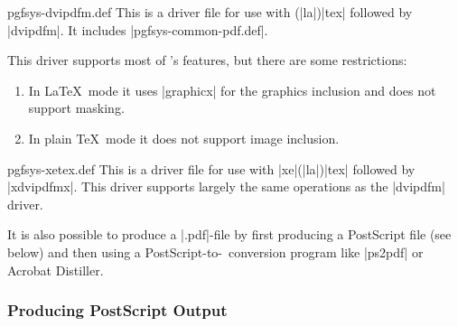 \begin{filedescription}{pgfsys-dvipdfm.def}
    This is a driver file for use with (|la|)|tex| followed by |dvipdfm|. It
    includes |pgfsys-common-pdf.def|.

    This driver supports most of \pgfname's features, but there are some
    restrictions:
    \begin{enumerate}
        \item In \LaTeX\ mode it uses |graphicx| for the graphics inclusion
            and does not support masking.
        \item In plain \TeX\ mode it does not support image inclusion.
    \end{enumerate}
\end{filedescription}

\begin{filedescription}{pgfsys-xetex.def}
    This is a driver file for use with |xe|(|la|)|tex| followed by |xdvipdfmx|.
    This driver supports largely the same operations as the |dvipdfm| driver.
\end{filedescription}

It is also possible to produce a |.pdf|-file by first producing a PostScript
file (see below) and then using a PostScript-to-\pdf\ conversion program like
|ps2pdf| or Acrobat Distiller.


\subsubsection{Producing PostScript Output}

